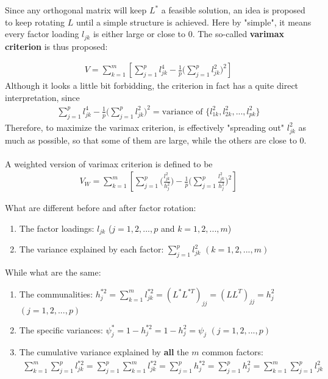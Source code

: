 \documentclass[12pt]{extarticle}
\newcommand{\<}{\langle}
\renewcommand{\>}{\rangle}
\theoremstyle{definition}
\begin{document}
Since any orthogonal matrix will keep $L^*$ a feasible solution, an idea is proposed to keep rotating $L$ until a simple structure is achieved. Here by "simple", it means every factor loading $l_{jk}$ is either large or close to 0. The so-called \textbf{varimax criterion} is thus proposed:
\begin{tcolorbox}[enhanced, drop fuzzy shadow, title=Varimax Criterion]
\begin{align*}
    V=\sum^m_{k=1}\left[\sum^p_{j=1}l^4_{jk} -\frac{1}{p}\Bigg(\sum^p_{j=1}l^2_{jk}\Bigg)^2 \right]
\end{align*}
Although it looks a little bit forbidding, the criterion in fact has a quite direct interpretation, since
\begin{align*}
    \sum^p_{j=1}l^4_{jk} -\frac{1}{p}\Bigg(\sum^p_{j=1}l^2_{jk}\Bigg)^2 = \text{variance of } \{l^2_{1k},l^2_{2k},...,l^2_{pk}\}
\end{align*}
Therefore, to maximize the varimax criterion, is effectively "spreading out" $l^2_{jk}$ as much as possible, so that some of them are large, while the others are close to 0.\\
\ \\
A weighted version of varimax criterion is defined to be
\begin{align*}
    V_W=\sum^m_{k=1}\left[\sum^p_{j=1}\Bigg(\frac{l^2_{jk}}{h^2_j}\Bigg) -\frac{1}{p}\Bigg(\sum^p_{j=1}\frac{l^2_{jk}}{h^2_j}\Bigg)^2 \right]
\end{align*}
\end{tcolorbox}
\newpage
What are different before and after factor rotation:
\begin{enumerate}
    \item The factor loadings: $l_{jk}$ ($j=1,2,...,p$ and $k=1,2,...,m$)
    \item The variance explained by each factor: $\sum^p_{j=1} l^2_{jk}$ $(k=1,2,...,m)$
\end{enumerate}
While what are the same:
\begin{enumerate}
    \item The communalities: $h^{*2}_j =\sum^m_{k=1}l^{*2}_{jk}=(L^*L^{*T})_{jj}=(LL^T)_{jj}=h^2_j$ $(j=1,2,...,p)$
    \item The specific variances: $\psi^*_j =1-h^{*2}_j =1-h^2_j =\psi_j$ $(j=1,2,...,p)$
    \item The cumulative variance explained by \textbf{all} the $m$ common factors:
    \begin{align*}
        \sum^m_{k=1}\sum^p_{j=1}l^{*2}_{jk}
        =\sum^p_{j=1}\sum^m_{k=1}l^{*2}_{jk}
        =\sum^p_{j=1}h^{*2}_j
        =\sum^p_{j=1}h^2_j
        =\sum^m_{k=1}\sum^p_{j=1}l^{2}_{jk}
    \end{align*}
\end{enumerate}
\end{document}

